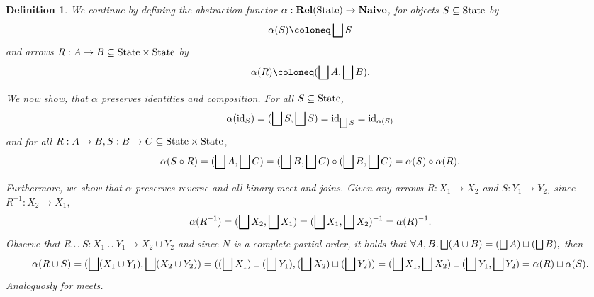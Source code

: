 \documentclass{article}
\newtheorem{definition}[theorem]{Definition}
\newcommand{\State}{\ensuremath \text{State}}
\newcommand{\id}{\ensuremath \operatorname{id}}
\newcommand{\Rel}{\ensuremath \mathbf{Rel}}
\newcommand{\Naive}{\ensuremath \mathbf{Naive}}
\newcommand{\lub}{\ensuremath \bigsqcup}
\begin{document}
\begin{definition}\normalfont
  We continue by defining the abstraction functor $\alpha : \Rel(\State) \rightarrow \Naive$, for objects $S \subseteq \State$ by
  \[
     \alpha(S) \coloneq \lub S
  \]
  and arrows $R : A \rightarrow B \subseteq \State \times \State$ by
  \[
     \alpha(R) \coloneq (\lub A, \lub B).
  \]

  We now show, that $\alpha$ preserves identities and composition. For all $S \subseteq \State$, \begin{align*}\alpha(\id_S) = (\lub S, \lub S) = \id_{\lub S} = \id_{\alpha(S)}\end{align*} and for all $R : A \rightarrow B, S : B \rightarrow C \subseteq \State \times \State$, \begin{align*} \alpha(S \circ R) = (\lub A, \lub C) = (\lub B, \lub C) \circ (\lub B, \lub C) = \alpha(S) \circ \alpha(R). \end{align*}

  Furthermore, we show that $\alpha$ preserves reverse and all binary meet and joins. Given any arrows $R: X_1 \rightarrow X_2$ and $S:Y_1 \rightarrow Y_2$, since $R^{-1} : X_2 \rightarrow X_1,$
  \begin{align*}
    \alpha(R^{-1}) = (\lub X_2, \lub X_1)
                   = (\lub X_1, \lub X_2)^{-1}
                   = \alpha(R)^{-1}.
  \end{align*}
  Observe that $R \cup S : X_1 \cup Y_1 \rightarrow X_2 \cup Y_2$ and since $N$ is a complete partial order, it holds that $\forall A,B. \lub(A \cup B) = (\lub A) \sqcup (\lub B),$ then
 \begin{align*} \alpha(R \cup S) = (\lub(X_1 \cup Y_1),\lub(X_2\cup Y_2))
                                 = ((\lub X_1) \sqcup (\lub Y_1), (\lub X_2) \sqcup (\lub Y_2))
                                 = (\lub X_1,\lub X_2) \sqcup (\lub Y_1, \lub Y_2)
                                 = \alpha(R) \sqcup \alpha(S).
 \end{align*}
 Analoguosly for meets.
\end{definition}
\end{document}
